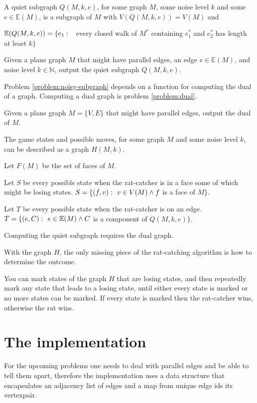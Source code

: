 \documentclass{article}
\begin{document}
	A quiet subgraph $Q(M, k, e)$, for some graph $M$, some noise level $k$ and some $e \in \mathbb{E}(M)$, is a subgraph of $M$ with $V(Q(M, k, e)) = V(M)$ and

	$\mathbb{E}(Q(M, k, e)) = \{e_1 \,\colon\  $ every closed walk of $M^*$ containing $e_1^*$ and $e_2^*$ has length at least $k\}$

	\begin{problem}\label{problem:noisy-subgraph}
		Given a plane graph $M$ that might have parallel edges, an edge $e \in \mathbb{E}(M)$, and noise level $k \in \mathbb{N}$, output the quiet subgraph $Q(M, k, e)$.
	\end{problem}

	Problem \ref{problem:noisy-subgraph} depends on a function for computing the dual of a graph. Computing a dual graph is problem \ref{problem:dual}.

	\begin{problem}\label{problem:dual}
		Given a plane graph $M = \{V, E\}$ that might have parallel edges, output the dual of $M$.
	\end{problem}

	The game states and possible moves, for some graph $M$ and some noise level $k$, can be described as a graph $H(M, k)$.

	Let $F(M)$ be the set of faces of $M$.

	Let $S$ be every possible state when the rat-catcher is in a face some of which might be losing states. $S = \{ (f, v) \,\colon\  v \in V(M) \land f$ is a face of $ M \}$.

	Let $T$ be every possible state when the rat-catcher is on an edge. $T = \{ (e, C) \,\colon\  e \in \mathbb{E}(M) \land C$ is a component of $Q(M, k, e) \}$.

	Computing the quiet subgraph requires the dual graph. 
	
	With the graph $H$, the only missing piece of the rat-catching algorithm is how to determine the outcome.

	You can mark states of the graph $H$ that are losing states, and then repeatedly mark any state that leads to a losing state, until either every state is marked or no more states can be marked. If every state is marked then the rat-catcher wins, otherwise the rat wins.

\section{The implementation}

	For the upcoming problems one needs to deal with parallel edges and be able to tell them apart, therefore the implementation uses a data structure that encapsulates an adjacency list of edges and a map from unique edge ids its vertexpair.
\end{document}
